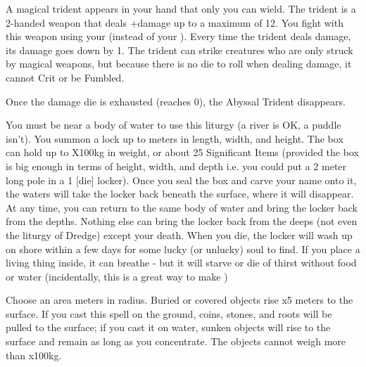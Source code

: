 {
\MYSTERY [
  Name = Abyssal Trident,
  Link = arcana-mystery-abyssal-trident,
  Paradigm = Force,
  Save = N,
  Duration = Session,
  Target = Self
]

A magical trident appears in your hand that only you can wield.  The trident is a 2-handed weapon that deals \DICE+\DICE damage up to a maximum of 12.   You fight with this weapon using your \FOC (instead of your \VIG).  Every time the trident deals damage, its damage goes down by 1. The trident can strike creatures who are only struck by magical weapons, but because there is no die to roll when dealing damage, it cannot Crit or be Fumbled. 

Once the damage die is exhausted (reaches 0), the Abyssal Trident disappears.

\MYSTERY [
  Name = Davy Jones's Locker,
  Link = arcana-mystery-davy-joness-locker,
  Paradigm = Prophesy,
  Save = N,
  Duration = Instant,
  Target = Close Target(s)
]

You must be near a body of water to use this liturgy (a river is OK, a puddle isn't).  You summon a lock up to \DICE meters in length, width, and height.  The box can hold up to \DICE X100kg in weight, or about 25 Significant Items (provided the box is big enough in terms of height, width, and depth i.e. you could put a 2 meter long pole in a 1 [die] locker).  Once you seal the box and carve your name onto it, the waters will take the locker back beneath the surface, where it will disappear.  At any time, you can return to the same body of water and bring the locker back from the depths. Nothing else can bring the locker back from the deeps (not even the liturgy of Dredge) except your death.  When you die, the locker will wash up on shore within a few days for some lucky (or unlucky) soul to find.
If you place a living thing inside, it can breathe - but it will starve or die of thirst without food or water (incidentally, this is a great way to make )

\MYSTERY [
  Name = Dredge,
  Link = arcana-mystery-dredge,
  Paradigm = Mind,
  Save = N,
  Duration = Concentration,
  Target = Close or Nearby
]

Choose an area \DICE meters in radius.  Buried or covered objects rise \DICE x5 meters to the surface.  If you cast this spell on the ground, coins, stones, and roots will be pulled to the surface; if you cast it on water, sunken objects will rise to the surface and remain as long as you concentrate.  The objects cannot weigh more than \DICE x100kg.  

}
